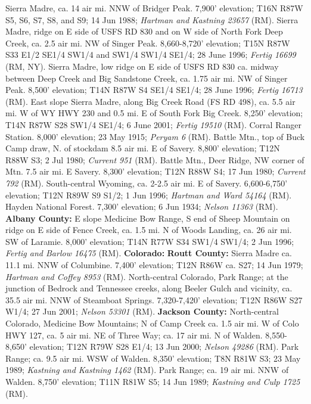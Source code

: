 Sierra Madre, ca. 14 air mi. NNW of Bridger Peak. 7,900’ elevation;
T16N R87W S5, S6, S7, S8, and S9; 14 Jun 1988;
\textit{Hartman and Kastning 23657} (RM).
Sierra Madre, ridge on E side of USFS RD 830 and on W side of North Fork
Deep Creek, ca. 2.5 air mi. NW of Singer Peak. 8,660-8,720' elevation;
T15N R87W S33 E1/2 SE1/4 SW1/4 and SW1/4 SW1/4 SE1/4; 28 June 1996;
\textit{Fertig 16699} (RM, NY).
Sierra Madre, low ridge on E side of USFS RD 830 ca. midway between Deep Creek
and Big Sandstone Creek, ca. 1.75 air mi. NW of Singer Peak. 8,500' elevation;
T14N R87W S4 SE1/4 SE1/4; 28 June 1996; \textit{Fertig 16713} (RM).
East slope Sierra Madre, along Big Creek Road (FS RD 498), ca. 5.5 air mi. W
of WY HWY 230 and 0.5 mi. E of South Fork Big Creek. 8,250' elevation;
T14N R87W S28 SW1/4 SE1/4; 6 June 2001; \textit{Fertig 19510} (RM).
Corral Ranger Station. 8,000' elevation; 23 May 1915; \textit{Peryam 6} (RM).
Battle Mtn., top of Buck Camp draw, N. of stockdam 8.5 air mi. E of Savery.
8,800' elevation; T12N R88W S3; 2 Jul 1980; \textit{Current 951} (RM).
Battle Mtn., Deer Ridge, NW corner of Mtn. 7.5 air mi. E Savery.
8,300' elevation; T12N R88W S4; 17 Jun 1980; \textit{Current 792} (RM).
South-central Wyoming, ca. 2-2.5 air mi. E of Savery. 6,600-6,750’ elevation;
T12N R89W S9 S1/2; 1 Jun 1996; \textit{Hartman and Ward 54164} (RM).
Hayden National Forest. 7,300' elevation; 6 Jun 1934;
\textit{Nelson 11363} (RM).
  \textbf{Albany County:}
E slope Medicine Bow Range, S end of Sheep Mountain on ridge on E side of Fence
Creek, ca. 1.5 mi. N of Woods Landing, ca. 26 air mi. SW of Laramie.
8,000' elevation; T14N R77W S34 SW1/4 SW1/4; 2 Jun 1996;
\textit{Fertig and Barlow 16475} (RM).
  \textbf{Colorado:}
  \textbf{Routt County:}
Sierra Madre ca. 11.1 mi. NNW of Columbine. 7,400' elevation; T12N R86W ca. S27;
14 Jun 1979; \textit{Hartman and Coffey 8953} (RM).
North-central Colorado, Park Range; at the junction of Bedrock and Tennessee
creeks, along Beeler Gulch and vicinity, ca. 35.5 air mi. NNW of Steamboat
Springs. 7,320-7,420' elevation; T12N R86W S27 W1/4; 27 Jun 2001;
\textit{Nelson 53301} (RM).
  \textbf{Jackson County:}
North-central Colorado, Medicine Bow Mountains; N of Camp Creek ca. 1.5 air
mi. W of Colo HWY 127, ca. 5 air mi. NE of Three Way; ca. 17 air mi. N of
Walden.  8,550-8,650' elevation; T12N R79W S28 E1/4; 13 Jun 2000;
\textit{Nelson 49286} (RM).
Park Range; ca. 9.5 air mi. WSW of Walden. 8,350' elevation; T8N R81W S3;
23 May 1989; \textit{Kastning and Kastning 1462} (RM).
Park Range; ca. 19 air mi. NNW of Walden. 8,750' elevation;
T11N R81W S5; 14 Jun 1989; \textit{Kastning and Culp 1725} (RM).

